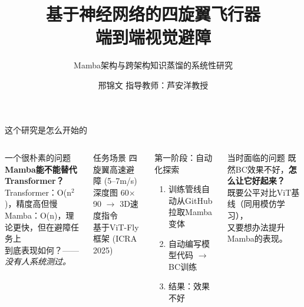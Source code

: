 \documentclass[aspectratio=169,10pt]{beamer}
\title[四旋翼视觉避障]{基于神经网络的四旋翼飞行器\\端到端视觉避障}
\subtitle{Mamba架构与跨架构知识蒸馏的系统性研究}
\author[邢锦文]{邢锦文 \quad 指导教师：芦安洋教授}
\institute[东北大学]{信息科学与工程学院·工业智能\\东北大学}
\date{}
\newcommand{\con}[1]{\textcolor{negative}{#1}}
\begin{document}
\begin{frame}\titlepage\end{frame}

\begin{frame}{这个研究是怎么开始的}
\begin{columns}[T]
\begin{block}{一个很朴素的问题}
\textbf{Mamba能不能替代Transformer？}\\[4pt]
\footnotesize
Transformer：O(n$^2$)，精度高但慢\\
Mamba：O(n)，理论更快，但在避障任务上\\
到底表现如何？——\textit{没有人系统测过。}
\end{block}

\begin{block}{任务场景}
四旋翼高速避障 (5--7m/s)\\
深度图 60$\times$90 $\to$ 3D速度指令\\
\footnotesize 基于ViT-Fly框架 (ICRA 2025)
\end{block}

\begin{alertblock}{第一阶段：自动化探索}
\begin{enumerate}
\item 训练管线自动从GitHub拉取Mamba变体
\item 自动编写模型代码 $\to$ BC训练
\item \con{结果：效果不好}
\end{enumerate}
\end{alertblock}

\begin{block}{当时面临的问题}
\footnotesize
既然BC效果不好，\textbf{怎么让它好起来？}\\
既要公平对比ViT基线（同用模仿学习），\\
又要想办法提升Mamba的表现。
\end{block}
\end{columns}
\end{frame}
\end{document}
